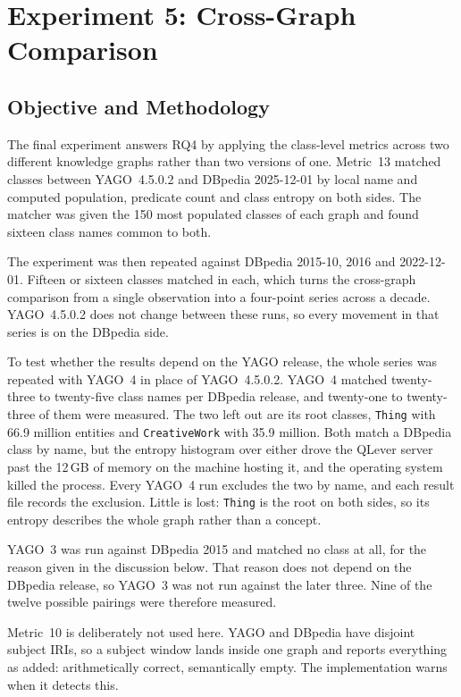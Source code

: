 \section{Experiment 5: Cross-Graph Comparison}
\label{sec:exp5}

\subsection{Objective and Methodology}

The final experiment answers RQ4 by applying the class-level metrics across two
different knowledge graphs rather than two versions of one. Metric~13 matched
classes between YAGO~4.5.0.2 and DBpedia 2025-12-01 by local name and computed
population, predicate count and class entropy on both sides. The matcher was
given the 150 most populated classes of each graph and found sixteen class names
common to both.

The experiment was then repeated against DBpedia 2015-10, 2016 and
2022-12-01. Fifteen or sixteen classes matched in each, which turns the
cross-graph comparison from a single observation into a four-point series
across a decade. YAGO~4.5.0.2 does not change between these runs, so every
movement in that series is on the DBpedia side.

To test whether the results depend on the YAGO release, the whole series was
repeated with YAGO~4 in place of YAGO~4.5.0.2. YAGO~4 matched twenty-three to
twenty-five class names per DBpedia release, and twenty-one to twenty-three of
them were measured. The two left out are its root classes, \texttt{Thing} with
66.9 million entities and \texttt{CreativeWork} with 35.9 million. Both match a
DBpedia class by name, but the entropy histogram over either drove the QLever
server past the 12\,GB of memory on the machine hosting it, and the operating
system killed the process. Every YAGO~4 run excludes the two by name, and each
result file records the exclusion. Little is lost: \texttt{Thing} is the root on
both sides, so its entropy describes the whole graph rather than a concept.

YAGO~3 was run against DBpedia 2015 and matched no class at all, for the reason
given in the discussion below. That reason does not depend on the DBpedia
release, so YAGO~3 was not run against the later three. Nine of the twelve
possible pairings were therefore measured.

Metric~10 is deliberately not used here. YAGO and DBpedia have disjoint subject
IRIs, so a subject window lands inside one graph and reports everything as added:
arithmetically correct, semantically empty. The implementation warns when it
detects this.

